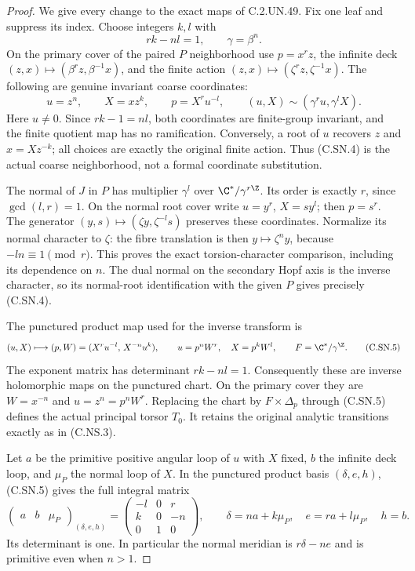 \begin{proof}
We give every change to the exact maps of C.2.UN.49.
Fix one leaf and suppress its index. Choose integers
$k,l$ with
\[
                         rk-nl=1,\qquad \gamma=\beta^n.
                                                        \tag{C.SN.3}
\]
On the primary cover of the paired $P$ neighborhood
use $p=x^rz$, the infinite deck
$(z,x)\mapsto(\beta^rz,\beta^{-1}x)$, and the finite
action $(z,x)\mapsto(\zeta^rz,\zeta^{-1}x)$.
The following are genuine invariant coarse coordinates:
\[
 u=z^n,\qquad X=xz^k,\qquad
 p=X^ru^{-l},\qquad
 (u,X)\sim(\gamma^ru,\gamma^lX).
                                                        \tag{C.SN.4}
\]
Here $u\ne0$. Since $rk-1=nl$, both coordinates
are finite-group invariant, and the finite quotient
map has no ramification. Conversely, a root of $u$
recovers $z$ and $x=Xz^{-k}$; all choices are exactly
the original finite action. Thus (C.SN.4) is the
actual coarse neighborhood, not a formal coordinate
substitution.

The normal of $J$ in $P$ has multiplier $\gamma^l$
over $\C^*/\gamma^{r\Z}$. Its order is exactly $r$,
since $\gcd(l,r)=1$. On the normal root cover write
$u=y^r$, $X=s y^l$; then $p=s^r$.
The generator $(y,s)\mapsto(\zeta y,\zeta^{-l}s)$
preserves these coordinates. Normalize its normal
character to $\zeta$: the fibre translation is then
$y\mapsto\zeta^n y$, because $-ln\equiv1\pmod r$.
This proves the exact torsion-character comparison,
including its dependence on $n$.
The dual normal on the secondary Hopf axis is
the inverse character, so its normal-root
identification with the given $P$ gives precisely
(C.SN.4).

The punctured product map used for the inverse
transform is
\[
 (u,X)\longmapsto(p,W)
       =(X^ru^{-l},\,X^{-n}u^k),\qquad
 u=p^nW^r,\quad X=p^kW^l,\qquad
                       F=\C^*/\gamma^{\Z}.               \tag{C.SN.5}
\]
The exponent matrix has determinant $rk-nl=1$.
Consequently these are inverse holomorphic maps
on the punctured chart. On the primary cover
they are $W=x^{-n}$ and $u=z^n=p^nW^r$.
Replacing the chart by $F\times\Delta_p$ through
(C.SN.5) defines the actual principal torsor $T_0$.
It retains the original analytic transitions
exactly as in (C.NS.3).

Let $a$ be the primitive positive angular loop of
$u$ with $X$ fixed, $b$ the infinite deck loop,
and $\mu_P$ the normal loop of $X$. In the
punctured product basis $(\delta,e,h)$,
(C.SN.5) gives the full integral matrix
\[
 \begin{pmatrix}a&b&\mu_P\end{pmatrix}_{(\delta,e,h)}
   =
 \begin{pmatrix}
   -l&0&r\\
    k&0&-n\\
    0&1&0
 \end{pmatrix},
 \qquad
 \delta=n a+k\mu_P,\quad e=r a+l\mu_P,\quad h=b.
                                                        \tag{C.SN.6}
\]
Its determinant is one. In particular the normal
meridian is $r\delta-ne$ and is primitive even
when $n>1$.


\end{proof}
